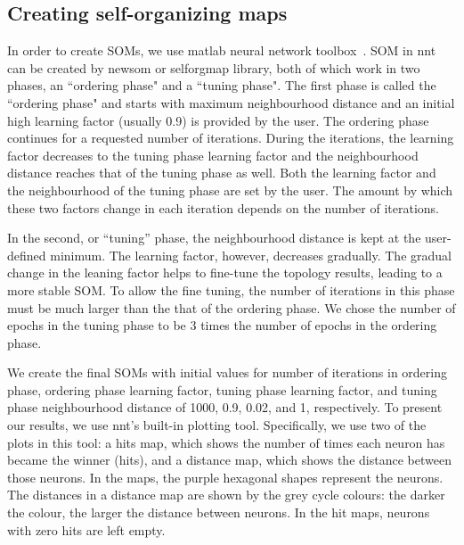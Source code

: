 \subsection{Creating self-organizing maps}
\label{sec: create_som}
     In order to create SOMs, we use {\sc matlab} neural network toolbox~\citep[NNT,][]{matlabtolbox}.
     SOM in {\sc nnt} can be created by {\sc newsom} or {\sc selforgmap} library, both of which work in two phases, an ``ordering phase" and a ``tuning phase". 
     The first phase is called the ``ordering phase" and
     starts with maximum neighbourhood distance and an initial high learning factor (usually 0.9) is provided by the user. 
     The ordering phase continues for a requested number of iterations.
     During the iterations, the learning factor decreases to the tuning phase learning factor and the neighbourhood distance reaches that of the tuning phase as well.
     Both the learning factor and the neighbourhood of the tuning phase are set by the user. 
     The amount by which these two factors change in each iteration depends on the number of iterations.
     
     In the second, or ``tuning'' phase,
     the neighbourhood distance is kept at the user-defined minimum.
     The learning factor, however, decreases gradually.
     The gradual change in the leaning factor helps to fine-tune the topology results, leading to a more stable SOM. 
     To allow the fine tuning, the number of iterations in this phase must be much larger than the that of the ordering phase. %
     We chose the number of epochs in the tuning phase to be 3 times the number of epochs in the ordering phase.
     
     We create the final SOMs with initial values for number of iterations in ordering phase, ordering phase learning factor, tuning phase learning factor, and tuning phase neighbourhood distance of 1000, 0.9, 0.02, and 1, respectively. %
     To present our results, we use {\sc nnt}'s built-in plotting tool.
     Specifically, we use two of the plots in this tool: a hits map, which shows the number of times each neuron has became the winner (hits), and a distance map, which shows the distance between those neurons.
     In the maps, the purple hexagonal shapes represent the neurons. 
     The distances in a distance map are shown by the grey cycle colours:
     the darker the colour, the larger the distance between neurons.
     In the hit maps, neurons with zero hits are left empty.
      
